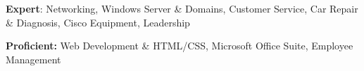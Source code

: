 \textbf{Expert}: Networking, Windows Server \& Domains, Customer Service, Car Repair \& Diagnosis, Cisco Equipment, Leadership

\spacing{}

\textbf{Proficient:} Web Development \& HTML/CSS, Microsoft Office Suite, Employee Management
